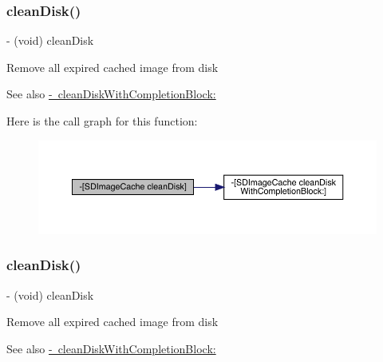 \subsubsection{\texorpdfstring{clean\+Disk()}{cleanDisk()}\hspace{0.1cm}{\footnotesize\ttfamily [2/3]}}
{\footnotesize\ttfamily -\/ (void) clean\+Disk \begin{DoxyParamCaption}{ }\end{DoxyParamCaption}}

Remove all expired cached image from disk \begin{DoxySeeAlso}{See also}
\mbox{\hyperlink{interface_s_d_image_cache_a1f82c522f4cb0fafdb063291cbcb23d0}{-\/ clean\+Disk\+With\+Completion\+Block\+:}} 
\end{DoxySeeAlso}
Here is the call graph for this function\+:\nopagebreak
\begin{figure}[H]
\begin{center}
\leavevmode
\includegraphics[width=350pt]{interface_s_d_image_cache_a491f75cc5c1df37dce478c00f898a0d8_cgraph}
\end{center}
\end{figure}
\mbox{\label{interface_s_d_image_cache_a491f75cc5c1df37dce478c00f898a0d8}} 
\subsubsection{\texorpdfstring{clean\+Disk()}{cleanDisk()}\hspace{0.1cm}{\footnotesize\ttfamily [3/3]}}
{\footnotesize\ttfamily -\/ (void) clean\+Disk \begin{DoxyParamCaption}{ }\end{DoxyParamCaption}}

Remove all expired cached image from disk \begin{DoxySeeAlso}{See also}
\mbox{\hyperlink{interface_s_d_image_cache_a1f82c522f4cb0fafdb063291cbcb23d0}{-\/ clean\+Disk\+With\+Completion\+Block\+:}} 
\end{DoxySeeAlso}
\mbox{\label{interface_s_d_image_cache_a1f82c522f4cb0fafdb063291cbcb23d0}} 
